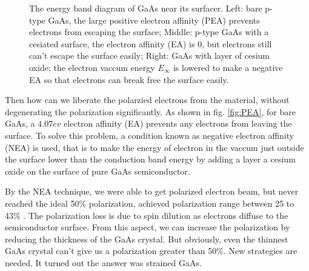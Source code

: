 \begin{figure}[h!]
\begin{subfigure}[b]{0.32\textwidth}
{
	}
	\label{fig:NEA}
    \end{subfigure}
    \caption{The energy band diagram of GaAs near its surfacer. 
    Left: bare p-type GaAs, the large positive electron affinity (PEA) 
    prevents electrons from escaping the surface; 
    Middle: p-type GaAs with a cesiated surface, the electron affinity (EA)
    is 0, but electrons still can't escape the surface easily; 
    Right: GaAs with layer of cesium oxide; the electron vaccum energy $E_\infty$ is
    lowered to make a negative EA so that electrons can break free the surface
    easily. \cite{CARDMAN1992317}}
\end{figure}
Then how can we liberate the polarzied electrons from the material, without 
degenerating the polarization significantly. As shown in fig. \ref{fig:PEA},
for bare GaAs, a $4.07 ev$ electron affinity (EA) prevents any electrons from
leaving the surface. To solve this problem, a condition known as negative
electron affinity (NEA) is used, that is to make the energy of electron in 
the vaccum just outside the surface lower than the conduction band energy by
adding a layer a cesium oxide on the surface of pure GaAs semiconductor.

By the NEA technique, we were able to get polarized electron beam, but never
reached the ideal 50\% polarization, achieved polarization range between 25 to 43\%
. The polarization loss is due to spin dilution as electrons diffuse to the 
semiconductor surface. From this aspect, we can increase the polarization by 
reducing the thickness of the GaAs crystal. But obviously, even the thinnest
GaAs crystal can't give us a polarization greater than 50\%. New strategies 
are needed. It turned out the answer was strained GaAs. \cite{CARDMAN1992317}

